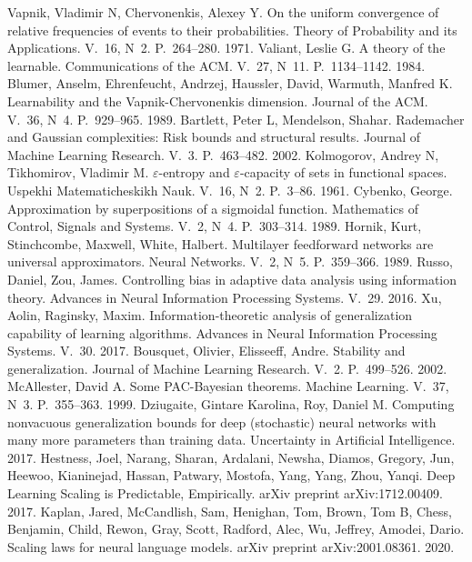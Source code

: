  Vapnik, Vladimir N, Chervonenkis, Alexey Y. On the uniform convergence of relative frequencies of events to their probabilities. Theory of Probability and its Applications. V.~16, N~2. P.~264--280. 1971.
 Valiant, Leslie G. A theory of the learnable. Communications of the ACM. V.~27, N~11. P.~1134--1142. 1984.
 Blumer, Anselm, Ehrenfeucht, Andrzej, Haussler, David, Warmuth, Manfred K. Learnability and the Vapnik-Chervonenkis dimension. Journal of the ACM. V.~36, N~4. P.~929--965. 1989.
 Bartlett, Peter L, Mendelson, Shahar. Rademacher and Gaussian complexities: Risk bounds and structural results. Journal of Machine Learning Research. V.~3. P.~463--482. 2002.
 Kolmogorov, Andrey N, Tikhomirov, Vladimir M. $\varepsilon$-entropy and $\varepsilon$-capacity of sets in functional spaces. Uspekhi Matematicheskikh Nauk. V.~16, N~2. P.~3--86. 1961.
 Cybenko, George. Approximation by superpositions of a sigmoidal function. Mathematics of Control, Signals and Systems. V.~2, N~4. P.~303--314. 1989.
 Hornik, Kurt, Stinchcombe, Maxwell, White, Halbert. Multilayer feedforward networks are universal approximators. Neural Networks. V.~2, N~5. P.~359--366. 1989.
 Russo, Daniel, Zou, James. Controlling bias in adaptive data analysis using information theory. Advances in Neural Information Processing Systems. V.~29. 2016.
 Xu, Aolin, Raginsky, Maxim. Information-theoretic analysis of generalization capability of learning algorithms. Advances in Neural Information Processing Systems. V.~30. 2017.
 Bousquet, Olivier, Elisseeff, Andre. Stability and generalization. Journal of Machine Learning Research. V.~2. P.~499--526. 2002.
 McAllester, David A. Some PAC-Bayesian theorems. Machine Learning. V.~37, N~3. P.~355--363. 1999.
 Dziugaite, Gintare Karolina, Roy, Daniel M. Computing nonvacuous generalization bounds for deep (stochastic) neural networks with many more parameters than training data. Uncertainty in Artificial Intelligence. 2017.
 Hestness, Joel, Narang, Sharan, Ardalani, Newsha, Diamos, Gregory, Jun, Heewoo, Kianinejad, Hassan, Patwary, Mostofa, Yang, Yang, Zhou, Yanqi. Deep Learning Scaling is Predictable, Empirically. arXiv preprint arXiv:1712.00409. 2017.
 Kaplan, Jared, McCandlish, Sam, Henighan, Tom, Brown, Tom B, Chess, Benjamin, Child, Rewon, Gray, Scott, Radford, Alec, Wu, Jeffrey, Amodei, Dario. Scaling laws for neural language models. arXiv preprint arXiv:2001.08361. 2020.
